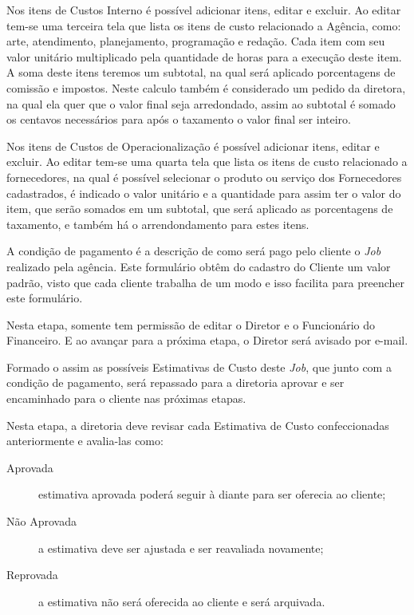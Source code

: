 \documentclass[
  12pt,				%
  openany,
  oneside,
  a4paper,			%
  english,			%
  brazil
]{article}
\numberwithin{figure}{section}
\numberwithin{table}{section}
\newcounter{subsubsubsection}[subsubsection]
\begin{document}
Nos itens de Custos Interno é possível adicionar itens, editar e excluir. Ao editar tem-se uma terceira tela que lista os itens de custo relacionado a Agência, como: arte, atendimento, planejamento, programação e redação. Cada item com seu valor unitário multiplicado pela quantidade de horas para a execução deste item. A soma deste itens teremos um subtotal, na qual será aplicado porcentagens de comissão e impostos. Neste calculo também é considerado um pedido da diretora, na qual ela quer que o valor final seja arredondado, assim ao subtotal é somado os centavos necessários para após o taxamento o valor final ser inteiro.

Nos itens de Custos de Operacionalização é possível adicionar itens, editar e excluir. Ao editar tem-se uma quarta tela que lista os itens de custo relacionado a fornecedores, na qual é possível selecionar o produto ou serviço dos Fornecedores cadastrados, é indicado o valor unitário e a quantidade para assim ter o valor do item, que serão somados em um subtotal, que será aplicado as porcentagens de taxamento, e também há o arrendondamento para estes itens.

A condição de pagamento é a descrição de como será pago pelo cliente o \textit{Job} realizado pela agência. Este formulário obtêm do cadastro do Cliente um valor padrão, visto que cada cliente trabalha de um modo e isso facilita para preencher este formulário.

Nesta etapa, somente tem permissão de editar o Diretor e o Funcionário do Financeiro. E ao avançar para a próxima etapa, o Diretor será avisado por e-mail.

Formado o assim as possíveis Estimativas de Custo deste \textit{Job}, que junto com a condição de pagamento, será repassado para a diretoria aprovar e ser encaminhado para o cliente nas próximas etapas.



Nesta etapa, a diretoria deve revisar cada Estimativa de Custo confeccionadas anteriormente e avalia-las como: 

\begin{description}
	\item[Aprovada] estimativa aprovada poderá seguir à diante para ser oferecia ao cliente;
	\item[Não Aprovada] a estimativa deve ser ajustada e ser reavaliada novamente;
	\item[Reprovada] a estimativa não será oferecida ao cliente e será arquivada.
\end{description}
\end{document}
